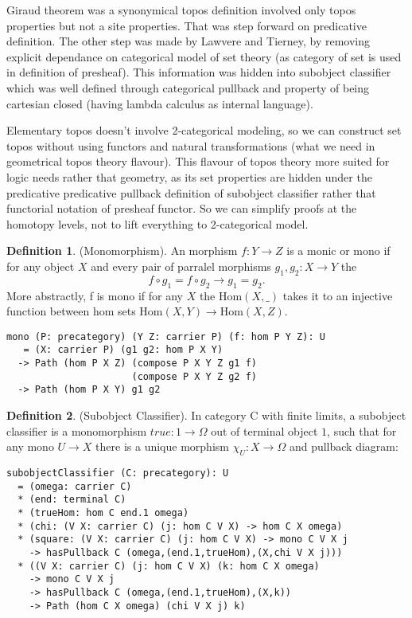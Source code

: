\documentclass{article}
\theoremstyle{definition}
\newtheorem{definition}{Definition}
\begin{document}
Giraud theorem was a synonymical topos definition involved only topos
properties but not a site properties. That was step forward on
predicative definition. The other step was made by Lawvere and Tierney,
by removing explicit dependance on categorical model of set
theory (as category of set is used in definition of presheaf). This information
was hidden into subobject classifier which was well defined through
categorical pullback and property of being cartesian
closed (having lambda calculus as internal language).

Elementary topos doesn't involve 2-categorical modeling, so we can construct
set topos without using functors and natural transformations
(what we need in geometrical topos theory flavour). This flavour of topos
theory more suited for logic needs rather that geometry, as its set properties
are hidden under the predicative predicative pullback definition of subobject classifier
rather that functorial notation of presheaf functor. So we can simplify proofs
at the homotopy levels, not to lift everything to 2-categorical model.

\begin{definition} (Monomorphism).
An morphism $f : Y \rightarrow Z $ is a monic or mono
if for any object $X$ and every pair of parralel morphisms $g_1,g_2: X \rightarrow Y$ the
$$
    f \circ g_1 = f \circ g_2 \rightarrow g_1 = g_2.
$$
More abstractly, f is mono if for any $X$ the $\mathrm{Hom}(X,\_)$ takes it to an injective
function between hom sets $\mathrm{Hom}(X,Y) \rightarrow \mathrm{Hom}(X,Z)$.
\begin{lstlisting}
mono (P: precategory) (Y Z: carrier P) (f: hom P Y Z): U
   = (X: carrier P) (g1 g2: hom P X Y)
  -> Path (hom P X Z) (compose P X Y Z g1 f)
                      (compose P X Y Z g2 f)
  -> Path (hom P X Y) g1 g2
\end{lstlisting}
\end{definition}

\begin{definition} (Subobject Classifier\cite{Johnstone14}).
In category $\mathrm{C}$ with finite limits,
a subobject classifier is a monomorphism $true: 1 \rightarrow \Omega$ out of terminal
object $\mathrm{1}$, such that for any mono $U \rightarrow X$ there is a unique
morphism $\chi_U : X \rightarrow \Omega$ and pullback diagram:
\begin{lstlisting}
subobjectClassifier (C: precategory): U
  = (omega: carrier C)
  * (end: terminal C)
  * (trueHom: hom C end.1 omega)
  * (chi: (V X: carrier C) (j: hom C V X) -> hom C X omega)
  * (square: (V X: carrier C) (j: hom C V X) -> mono C V X j
    -> hasPullback C (omega,(end.1,trueHom),(X,chi V X j)))
  * ((V X: carrier C) (j: hom C V X) (k: hom C X omega)
    -> mono C V X j
    -> hasPullback C (omega,(end.1,trueHom),(X,k))
    -> Path (hom C X omega) (chi V X j) k)
\end{lstlisting}
\end{definition}
\end{document}
